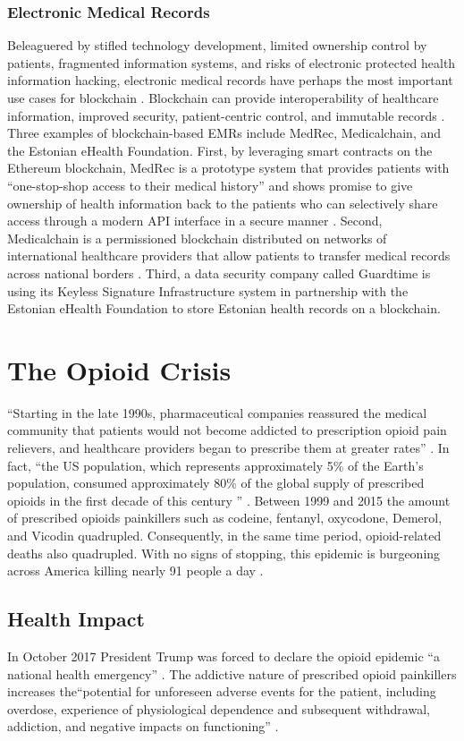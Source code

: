 \documentclass[sigconf]{acmart}
\begin{document}
\subsubsection{Electronic Medical Records} Beleaguered by stifled technology development, limited ownership control by patients, fragmented information systems, and risks of electronic protected health information hacking, electronic medical records have perhaps the most important use cases for blockchain \cite{yuan2016blockchains}. Blockchain can provide interoperability of healthcare information, improved security, patient-centric control, and immutable records \cite{das2017}. Three examples of blockchain-based EMRs include MedRec, Medicalchain, and the Estonian eHealth Foundation. First, by leveraging smart contracts on the Ethereum blockchain, MedRec is a prototype system that provides patients with ``one-stop-shop access to their medical history'' and shows promise to give ownership of health information back to the patients who can selectively share access through a modern API interface in a secure manner \cite{ekblaw2016medrec}. Second, Medicalchain is a permissioned blockchain distributed on networks of international healthcare providers that allow patients to transfer medical records across national borders \cite{hitchingHealthcare}. Third, a data security company called Guardtime is using its Keyless Signature Infrastructure system in partnership with the Estonian eHealth Foundation to store Estonian health records on a blockchain.

\section{The Opioid Crisis}
 ``Starting in the late 1990s, pharmaceutical companies reassured the medical community that patients would not become addicted to prescription opioid pain relievers, and healthcare providers began to prescribe them at greater rates'' \cite{opsis1}. In fact, ``the US population, which represents approximately 5\% of the Earth's population, consumed approximately 80\% of the global supply of prescribed opioids in the first decade of this century '' \cite{Vowles01}. Between 1999 and 2015 the amount of prescribed opioids painkillers such as codeine, fentanyl, oxycodone, Demerol, and Vicodin quadrupled. Consequently, in the same time period, opioid-related deaths also quadrupled.  With no signs of stopping, this epidemic is burgeoning across America killing nearly 91 people a day \cite{opsis10}. 
 
 \subsection{Health Impact}
 In October 2017 President Trump was forced to declare the opioid epidemic ``a national health emergency'' \cite{opsis3}. The addictive nature of prescribed opioid painkillers increases the``potential for unforeseen adverse events for the patient, including overdose, experience of physiological dependence and subsequent withdrawal, addiction, and negative impacts on functioning'' \cite{Vowles01}. 
 
\end{document}

